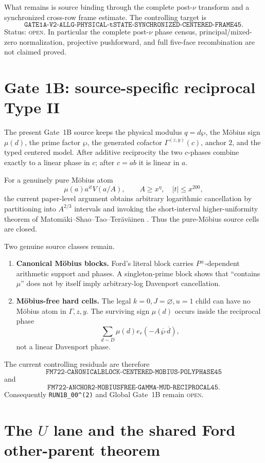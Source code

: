 \documentclass[11pt]{article}
\theoremstyle{definition}
\newcommand{\1}{\mathbf 1}
\newcommand{\openstatus}{\textsc{open}}
\begin{document}
What remains is source binding through the complete post-$\nu$ transform and a synchronized cross-row frame estimate. The controlling target is
\[
\boxed{\texttt{GATE1A-V2-ALLG-PHYSICAL-tSTATE-SYNCHRONIZED-CENTERED-FRAME45}}.
\]
Status: \openstatus. In particular the complete post-$\nu$ phase census, principal/mixed-zero normalization, projective pushforward, and full five-face recombination are not claimed proved.

\section{Gate 1B: source-specific reciprocal Type II}

The present Gate~1B source keeps the physical modulus $q=d\wp$, the Möbius sign $\mu(d)$, the prime factor $\wp$, the generated cofactor $\Gamma^{(z,y)}(c)$, anchor $2$, and the typed centered model. After additive reciprocity the two $c$-phases combine exactly to a linear phase in $c$; after $c=ab$ it is linear in $a$.

For a genuinely pure Möbius atom
\[
\mu(a)a^{it}V(a/A),\qquad A\ge x^\eta,\quad |t|\le x^{200},
\]
the current paper-level argument obtains arbitrary logarithmic cancellation by partitioning into $A^{2/3}$ intervals and invoking the short-interval higher-uniformity theorem of Matom\"aki--Shao--Tao--Ter\"av\"ainen \cite{MSTT2022}. Thus the pure-Möbius source cells are closed.

Two genuine source classes remain.
\begin{enumerate}[leftmargin=*]
\item \textbf{Canonical Möbius blocks.} Ford's literal block carries $P^\pm$-dependent arithmetic support and phases. A singleton-prime block shows that ``contains $\mu$'' does not by itself imply arbitrary-log Davenport cancellation.
\item \textbf{Möbius-free hard cells.} The legal $k=0,J=\varnothing,u=1$ child can have no Möbius atom in $\Gamma,z,y$. The surviving sign $\mu(d)$ occurs inside the reciprocal phase
\[
\sum_{d\sim D}\mu(d)e_r(-A\,\overline\wp\,\overline d),
\]
not a linear Davenport phase.
\end{enumerate}
The current controlling residuals are therefore
\[
\texttt{FM722-CANONICALBLOCK-CENTERED-MOBIUS-POLYPHASE45}
\]
and
\[
\texttt{FM722-ANCHOR2-MOBIUSFREE-GAMMA-MUD-RECIPROCAL45}.
\]
Consequently \texttt{RUN1B\_00\textasciicircum(2)} and Global Gate~1B remain \openstatus.

\section{The $U$ lane and the shared Ford other-parent theorem}
\end{document}
